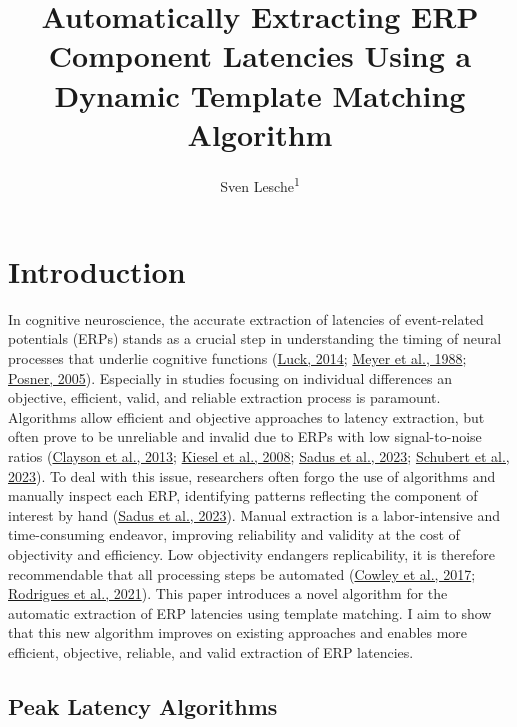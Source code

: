 \documentclass[
  man]{apa7}
\title{Automatically Extracting ERP Component Latencies Using a Dynamic Template Matching Algorithm}
\author{Sven Lesche\textsuperscript{1}}
\date{}
\affiliation{\vspace{0.5cm}\textsuperscript{1} Ruprecht-Karls-University Heidelberg}
\begin{document}
\maketitle

\hypertarget{introduction}{%
\section{Introduction}\label{introduction}}

In cognitive neuroscience, the accurate extraction of latencies of event-related potentials (ERPs) stands as a crucial step in understanding the timing of neural processes that underlie cognitive functions (\protect\hyperlink{ref-luck2014introduction}{Luck, 2014}; \protect\hyperlink{ref-meyer1988modern}{Meyer et al., 1988}; \protect\hyperlink{ref-posner2005timing}{Posner, 2005}). Especially in studies focusing on individual differences an objective, efficient, valid, and reliable extraction process is paramount. Algorithms allow efficient and objective approaches to latency extraction, but often prove to be unreliable and invalid due to ERPs with low signal-to-noise ratios (\protect\hyperlink{ref-clayson2013noise}{Clayson et al., 2013}; \protect\hyperlink{ref-kiesel2008measurement}{Kiesel et al., 2008}; \protect\hyperlink{ref-sadus2023multiverse}{Sadus et al., 2023}; \protect\hyperlink{ref-schubert2023robust}{Schubert et al., 2023}). To deal with this issue, researchers often forgo the use of algorithms and manually inspect each ERP, identifying patterns reflecting the component of interest by hand (\protect\hyperlink{ref-sadus2023multiverse}{Sadus et al., 2023}). Manual extraction is a labor-intensive and time-consuming endeavor, improving reliability and validity at the cost of objectivity and efficiency. Low objectivity endangers replicability, it is therefore recommendable that all processing steps be automated (\protect\hyperlink{ref-cowley2017computational}{Cowley et al., 2017}; \protect\hyperlink{ref-rodrigues2021epos}{Rodrigues et al., 2021}). This paper introduces a novel algorithm for the automatic extraction of ERP latencies using template matching. I aim to show that this new algorithm improves on existing approaches and enables more efficient, objective, reliable, and valid extraction of ERP latencies.

\hypertarget{peak-latency-algorithms}{%
\subsection{Peak Latency Algorithms}\label{peak-latency-algorithms}}
\end{document}
